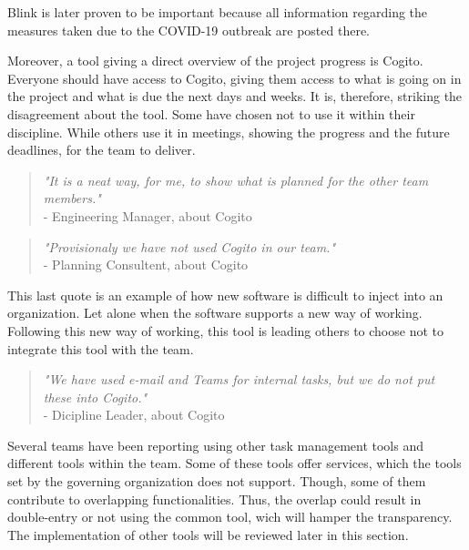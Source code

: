 Blink is later proven to be important because all information regarding the measures taken due to the COVID-19 outbreak are posted there.

Moreover, a tool giving a direct overview of the project progress is Cogito.  Everyone should have access to Cogito, giving them access to what is going on in the project and what is due the next days and weeks. It is, therefore, striking the disagreement about the tool. Some have chosen not to use it within their discipline. While others use it in meetings, showing the progress and the future deadlines, for the team to deliver. 

\begin{quote}
    \textit{"It is a neat way, for me, to show what is planned for the other team members."}\\
    - Engineering Manager, about Cogito
\end{quote}

\begin{quote}
    \textit{"Provisionaly we have not used Cogito in our team."}\\
    - Planning Consultent, about Cogito 
\end{quote}

This last quote is an example of how new software is difficult to inject into an organization. Let alone when the software supports a new way of working. Following this new way of working, this tool is leading others to choose not to integrate this tool with the team.

\begin{quote}
    \textit{"We have used e-mail and Teams for internal tasks, but we do not put these into Cogito."}\\
    - Dicipline Leader, about Cogito
\end{quote}

Several teams have been reporting using other task management tools and different tools within the team. Some of these tools offer services, which the tools set by the governing organization does not support. Though, some of them contribute to overlapping functionalities. Thus, the overlap could result in double-entry or not using the common tool, wich will hamper the transparency. The implementation of other tools will be reviewed later in this section. 


